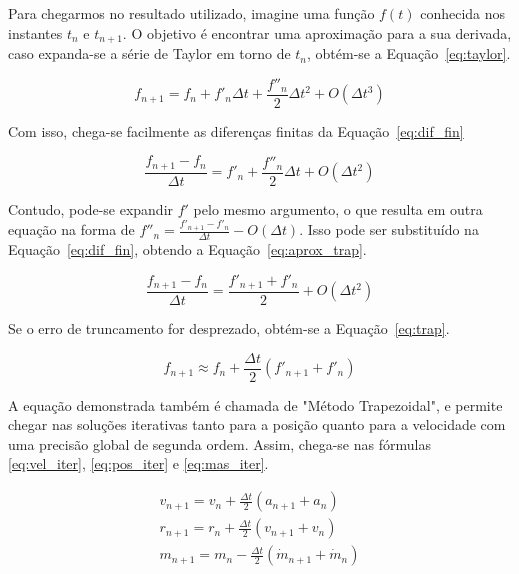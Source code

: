 Para chegarmos no resultado utilizado, imagine uma função \(f(t)\) conhecida nos instantes \(t_n\) e \(t_{n+1}\). O objetivo é encontrar uma aproximação para a sua derivada, caso expanda-se a série de Taylor em torno de \(t_n\), obtém-se a Equação~\eqref{eq:taylor}.

\begin{equation}
  f_{n+1} = f_n + f'_n\Delta t + \frac{f''_n}{2}\Delta t^2 +O(\Delta t^3)
  \label{eq:taylor}
\end{equation}

Com isso, chega-se facilmente as diferenças finitas da Equação~\eqref{eq:dif_fin}

\begin{equation}
  \frac{f_{n+1}-f_n }{\Delta t} = f'_n+ \frac{f''_n}{2}\Delta t +O(\Delta t^2)
  \label{eq:dif_fin}
\end{equation}

Contudo, pode-se expandir \(f'\) pelo mesmo argumento, o que resulta em outra equação na forma de \(f''_n =\frac{f'_{n+1}-f'_n}{\Delta t}-O(\Delta t)\). Isso pode ser substituído na Equação~\eqref{eq:dif_fin}, obtendo a Equação~\eqref{eq:aprox_trap}.

\begin{equation}
  \frac{f_{n+1}-f_n }{\Delta t} = \frac{f'_{n+1}+f'_{n}}{2}+O(\Delta t^2)
  \label{eq:aprox_trap}
\end{equation}

Se o erro de truncamento for desprezado, obtém-se a Equação~\eqref{eq:trap}.


\begin{equation}
  f_{n+1} \approx f_n+\frac{\Delta t}{2}(f'_{n+1}+f'_{n})
  \label{eq:trap}
\end{equation}

A equação demonstrada também é chamada de "Método Trapezoidal", e permite chegar nas soluções iterativas tanto para a posição quanto para a velocidade com uma precisão global de segunda ordem. Assim, chega-se nas fórmulas \eqref{eq:vel_iter}, \eqref{eq:pos_iter} e \eqref{eq:mas_iter}. 

\begin{align}
  v_{n+1} = v_n+\frac{\Delta t}{2}(a_{n+1}+a_{n}) \label{eq:vel_iter}\\
  r_{n+1} = r_n+\frac{\Delta t}{2}(v_{n+1}+v_{n}) \label{eq:pos_iter} \\
  m_{n+1} = m_n-\frac{\Delta t}{2}(\dot{m}_{n+1}+\dot{m}_{n})
  \label{eq:mas_iter}
\end{align}

